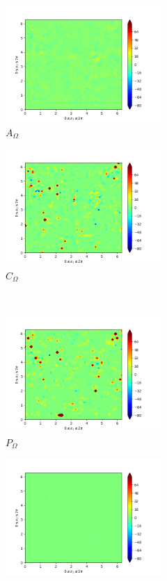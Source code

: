 \begin{figure}[H]
\begin{subfigure}{0.45\textwidth}
        \includegraphics[height=1.75in]{media/run-cds-65/A-enst-1400.png}
        \caption{$A_{\Omega}$}
    \end{subfigure}
    \newline
    \begin{subfigure}{0.45\textwidth}
        \includegraphics[height=1.75in]{media/run-cds-65/Pi-enst-1400.png}
        \caption{$C_{\Omega}$}
    \end{subfigure}
    ~
    \begin{subfigure}{0.45\textwidth}
        \includegraphics[height=1.75in]{media/run-cds-65/P-enst-1400.png}
        \caption{$P_{\Omega}$}
    \end{subfigure}
    \newline
    \begin{subfigure}{0.45\textwidth}
        \includegraphics[height=1.75in]{media/run-cds-65/B-enst-1400.png}

\end{subfigure}
\end{figure}
